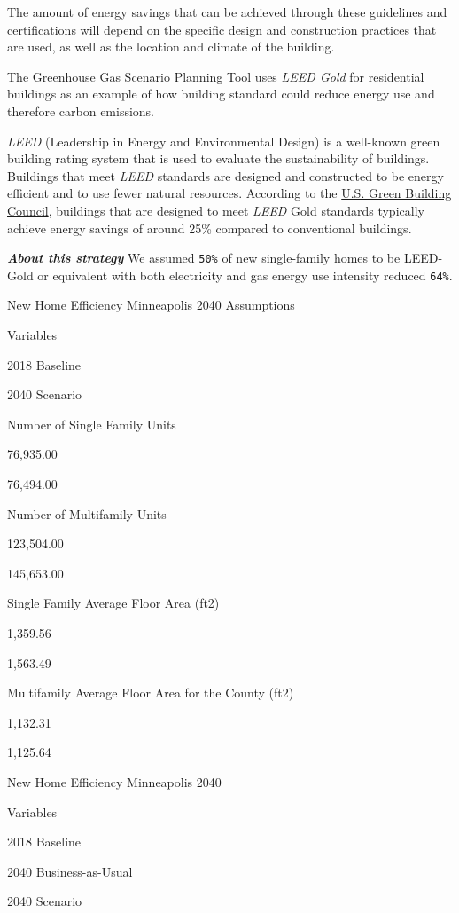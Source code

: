 \documentclass[
]{book}
\begin{document}
The amount of energy savings that can be achieved through these guidelines and certifications will depend on the specific design and construction practices that are used, as well as the location and climate of the building.

The Greenhouse Gas Scenario Planning Tool uses \emph{LEED Gold} for residential buildings as an example of how building standard could reduce energy use and therefore carbon emissions.

\emph{LEED} (Leadership in Energy and Environmental Design) is a well-known green building rating system that is used to evaluate the sustainability of buildings. Buildings that meet \emph{LEED} standards are designed and constructed to be energy efficient and to use fewer natural resources. According to the \href{https://www.usgbc.org/leed/rating-systems/residential}{U.S. Green Building Council}, buildings that are designed to meet \emph{LEED} Gold standards typically achieve energy savings of around 25\% compared to conventional buildings.

\textbf{\emph{About this strategy}} We assumed \texttt{50\%} of new single-family homes to be LEED-Gold or equivalent with both electricity and gas energy use intensity reduced \texttt{64\%}.

\label{tab:tab-new-home-efficiency}New Home Efficiency Minneapolis 2040 Assumptions

Variables

2018 Baseline

2040 Scenario

Number of Single Family Units

76,935.00

76,494.00

Number of Multifamily Units

123,504.00

145,653.00

Single Family Average Floor Area (ft2)

1,359.56

1,563.49

Multifamily Average Floor Area for the County (ft2)

1,132.31

1,125.64

\label{tab:unnamed-chunk-47}New Home Efficiency Minneapolis 2040

Variables

2018 Baseline

2040 Business-as-Usual

2040 Scenario
\end{document}
